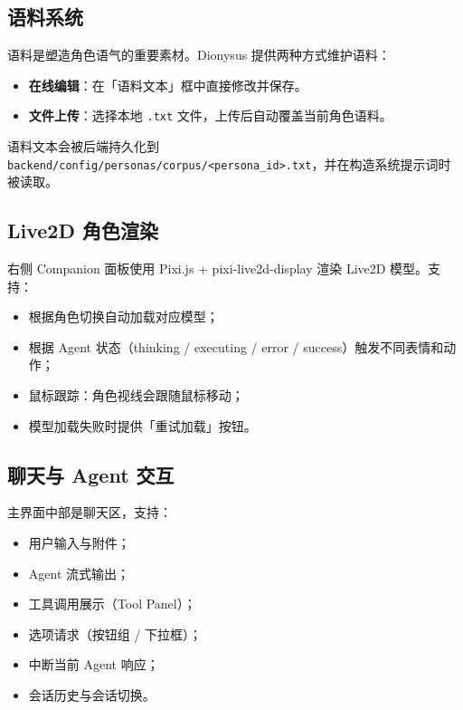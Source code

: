 \documentclass[12pt,a4paper]{article}
\begin{document}
\subsection{语料系统}

语料是塑造角色语气的重要素材。Dionysus 提供两种方式维护语料：

\begin{itemize}[leftmargin=2em]
  \item \textbf{在线编辑}：在「语料文本」框中直接修改并保存。
  \item \textbf{文件上传}：选择本地 \texttt{.txt} 文件，上传后自动覆盖当前角色语料。
\end{itemize}

语料文本会被后端持久化到 \texttt{backend/config/personas/corpus/<persona\_id>.txt}，并在构造系统提示词时被读取。

\subsection{Live2D 角色渲染}

右侧 Companion 面板使用 Pixi.js + pixi-live2d-display 渲染 Live2D 模型。支持：

\begin{itemize}[leftmargin=2em]
  \item 根据角色切换自动加载对应模型；
  \item 根据 Agent 状态（thinking / executing / error / success）触发不同表情和动作；
  \item 鼠标跟踪：角色视线会跟随鼠标移动；
  \item 模型加载失败时提供「重试加载」按钮。
\end{itemize}

\subsection{聊天与 Agent 交互}

主界面中部是聊天区，支持：

\begin{itemize}[leftmargin=2em]
  \item 用户输入与附件；
  \item Agent 流式输出；
  \item 工具调用展示（Tool Panel）；
  \item 选项请求（按钮组 / 下拉框）；
  \item 中断当前 Agent 响应；
  \item 会话历史与会话切换。
\end{itemize}
\end{document}
